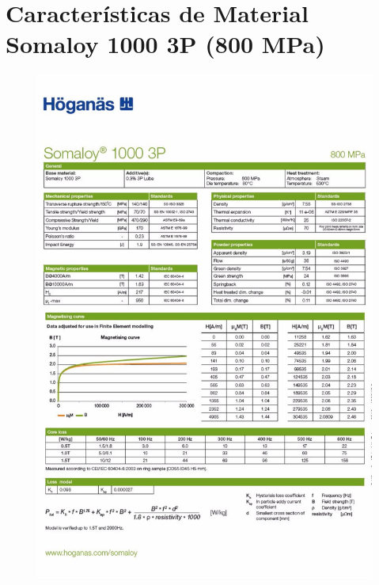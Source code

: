 \chapter{Caracter\'isticas de Material Somaloy 1000 3P (800 MPa)}

\newpage

\begin{figure}[H]
\centering
	\includegraphics[width=\textwidth, height=\textheight]{images/Anexos/Somaloy}
\end{figure}
